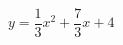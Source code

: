 \hspace*{2mm}\begin{minipage}[t]{\dimexpr\linewidth-2mm\relax}\vspace{0pt}
$y=\dfrac{1}{3}x^2+\dfrac{7}{3}x+4$\end{minipage}
